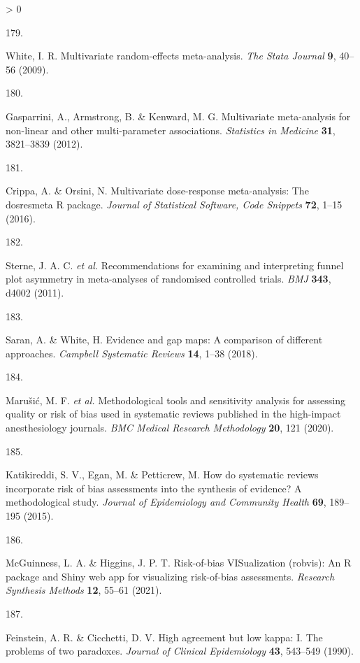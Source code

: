 \documentclass[a4paper, twoside]{templates/ociamthesis}
\newlength{\cslhangindent}
\newlength{\csllabelwidth}
\newenvironment{CSLReferences}[3] %
 {%
  \setlength{\parindent}{0pt}
  \ifodd #1 \everypar{\setlength{\hangindent}{\cslhangindent}}\ignorespaces\fi
  \ifnum #2 > 0
  \setlength{\parskip}{#2\baselineskip}
  \fi
 }%
 {}
\newcommand{\CSLLeftMargin}[1]{\parbox[t]{\maxof{\widthof{#1}}{\csllabelwidth}}{#1}}
\newcommand{\CSLRightInline}[1]{\parbox[t]{\linewidth - \csllabelwidth}{#1}}
\begin{document}
\begin{CSLReferences}{0}{0}
\leavevmode\hypertarget{ref-white2009}{}%
\CSLLeftMargin{179. }
\CSLRightInline{White, I. R. Multivariate random-effects meta-analysis. \emph{The Stata Journal} \textbf{9}, 40--56 (2009).}

\leavevmode\hypertarget{ref-gasparrini2012}{}%
\CSLLeftMargin{180. }
\CSLRightInline{Gasparrini, A., Armstrong, B. \& Kenward, M. G. Multivariate meta-analysis for non-linear and other multi-parameter associations. \emph{Statistics in Medicine} \textbf{31}, 3821--3839 (2012).}

\leavevmode\hypertarget{ref-crippa2016}{}%
\CSLLeftMargin{181. }
\CSLRightInline{Crippa, A. \& Orsini, N. Multivariate dose-response meta-analysis: The dosresmeta {R} package. \emph{Journal of Statistical Software, Code Snippets} \textbf{72}, 1--15 (2016).}

\leavevmode\hypertarget{ref-sterne2011}{}%
\CSLLeftMargin{182. }
\CSLRightInline{Sterne, J. A. C. \emph{et al.} Recommendations for examining and interpreting funnel plot asymmetry in meta-analyses of randomised controlled trials. \emph{BMJ} \textbf{343}, d4002 (2011).}

\leavevmode\hypertarget{ref-saran2018}{}%
\CSLLeftMargin{183. }
\CSLRightInline{Saran, A. \& White, H. Evidence and gap maps: A comparison of different approaches. \emph{Campbell Systematic Reviews} \textbf{14}, 1--38 (2018).}

\leavevmode\hypertarget{ref-marusic2020}{}%
\CSLLeftMargin{184. }
\CSLRightInline{Marušić, M. F. \emph{et al.} Methodological tools and sensitivity analysis for assessing quality or risk of bias used in systematic reviews published in the high-impact anesthesiology journals. \emph{BMC Medical Research Methodology} \textbf{20}, 121 (2020).}

\leavevmode\hypertarget{ref-katikireddi2015}{}%
\CSLLeftMargin{185. }
\CSLRightInline{Katikireddi, S. V., Egan, M. \& Petticrew, M. How do systematic reviews incorporate risk of bias assessments into the synthesis of evidence? A methodological study. \emph{Journal of Epidemiology and Community Health} \textbf{69}, 189--195 (2015).}

\leavevmode\hypertarget{ref-mcguinness2020robvisPaper}{}%
\CSLLeftMargin{186. }
\CSLRightInline{McGuinness, L. A. \& Higgins, J. P. T. Risk-of-bias {VISualization} (robvis): An {R} package and {Shiny} web app for visualizing risk-of-bias assessments. \emph{Research Synthesis Methods} \textbf{12}, 55--61 (2021).}

\leavevmode\hypertarget{ref-feinstein1990}{}%
\CSLLeftMargin{187. }
\CSLRightInline{Feinstein, A. R. \& Cicchetti, D. V. High agreement but low kappa: I. {The} problems of two paradoxes. \emph{Journal of Clinical Epidemiology} \textbf{43}, 543--549 (1990).}


\end{CSLReferences}
\end{document}
